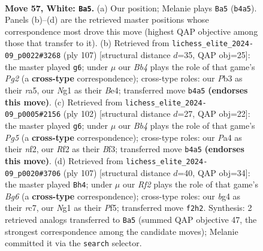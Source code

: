 \documentclass[11pt]{article}
\begin{document}
\clearpage

\begin{figure}[p]\centering
\begin{subfigure}{0.46\textwidth}\centering
\resizebox{\linewidth}{!}{%
\newchessgame
\chessboard[
  setfen={8/1B1k4/7r/8/PB4bp/1PK2p2/5R2/6N1 w - - 8 57},
  showmover=false,
  pgfstyle=straightmove, color=movearrow, markmove={b4-a5}
]}
\caption{}
\end{subfigure}\hfill
\begin{subfigure}{0.46\textwidth}\centering
\resizebox{\linewidth}{!}{%
\newchessgame
\chessboard[
  setfen={8/3r1kp1/3P4/R6p/4bB2/4P3/6PK/8 b - - 6 54},
  showmover=false,
  pgfstyle=straightmove, color=movearrow, markmove={g7-g6}
]}
\caption{}
\end{subfigure}
\\[4pt]
\begin{subfigure}{0.46\textwidth}\centering
\resizebox{\linewidth}{!}{%
\newchessgame
\chessboard[
  setfen={6k1/8/5K2/6Pp/2b5/1p3BP1/p4n2/B1N5 w - - 5 52},
  showmover=false,
  pgfstyle=straightmove, color=movearrow, markmove={g5-g6}
]}
\caption{}
\end{subfigure}\hfill
\begin{subfigure}{0.46\textwidth}\centering
\resizebox{\linewidth}{!}{%
\newchessgame
\chessboard[
  setfen={8/2RP4/6k1/3rPp1p/4pP2/4B1b1/4K3/8 b - - 0 54},
  showmover=false,
  pgfstyle=straightmove, color=movearrow, markmove={g3-h4}
]}
\caption{}
\end{subfigure}
\caption{\textbf{Move 57, White: \texttt{Ba5}.} (a) Our position; Melanie plays \texttt{Ba5} (\texttt{b4a5}). Panels (b)--(d) are the retrieved master positions whose correspondence most drove this move (highest QAP objective among those that transfer to it). (b) Retrieved from \texttt{lichess\_elite\_2024-09\_p0022\#3268} (ply 107) [structural distance $d$=35, QAP obj=25]: the master played \texttt{g6}; under $\mu$ our \emph{Bb4} plays the role of that game's \emph{Pg2} (a \textbf{cross-type} correspondence); cross-type roles: our \emph{P}b3 as their \emph{r}a5, our \emph{N}g1 as their \emph{B}e4; transferred move \texttt{b4a5} \textbf{(endorses this move)}. (c) Retrieved from \texttt{lichess\_elite\_2024-09\_p0005\#2156} (ply 102) [structural distance $d$=27, QAP obj=22]: the master played \texttt{g6}; under $\mu$ our \emph{Bb4} plays the role of that game's \emph{Pg5} (a \textbf{cross-type} correspondence); cross-type roles: our \emph{P}a4 as their \emph{n}f2, our \emph{R}f2 as their \emph{B}f3; transferred move \texttt{b4a5} \textbf{(endorses this move)}. (d) Retrieved from \texttt{lichess\_elite\_2024-09\_p0020\#3706} (ply 107) [structural distance $d$=40, QAP obj=34]: the master played \texttt{Bh4}; under $\mu$ our \emph{Rf2} plays the role of that game's \emph{Bg6} (a \textbf{cross-type} correspondence); cross-type roles: our \emph{b}g4 as their \emph{r}c7, our \emph{N}g1 as their \emph{P}f5; transferred move \texttt{f2h2}. Synthesis: 2 retrieved analogs transferred to \texttt{Ba5} (summed QAP objective 47, the strongest correspondence among the candidate moves); Melanie committed it via the \texttt{search} selector.}
\label{fig:thought-m112}
\end{figure}
\end{document}
